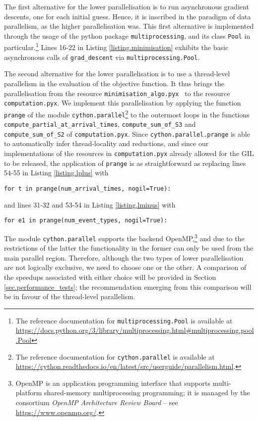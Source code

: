 \documentclass[10pt, article,table]{article}
\begin{document}
The first alternative for the lower parallelisation is to run asynchronous gradient descents, one for each initial guess. Hence, it is inscribed in the paradigm of data parallelism, as the higher parallelisation was. This first alternative is implemented through the usage of the python package \texttt{multiprocessing}, and its class \texttt{Pool} in particular.\footnote{The reference documentation for \texttt{multiprocessing.Pool} is available at \url{https://docs.python.org/3/library/multiprocessing.html\#multiprocessing.pool.Pool}} Lines 16-22 in Listing \ref{listing.minimisation} exhibits the basic asynchronous calls of \texttt{grad\_descent} via \texttt{multiprocessing.Pool}.   

The second alternative for the lower parallelisation is to use a thread-level parallelism in the evaluation of the objective function. It thus brings the parallelisation from the resource \texttt{minimisation\_algo.pyx } to the resource \texttt{computation.pyx}. We implement this parallelisation by applying the function \texttt{prange} of the module \texttt{cython.parallel}\footnote{The reference documentation for \texttt{cython.parallel} is available at \url{https://cython.readthedocs.io/en/latest/src/userguide/parallelism.html}.} to the outermost loops in the functions \texttt{compute\_partial\_at\_arrival\_times}, \texttt{compute\_sum\_of\_S3} and \texttt{compute\_sum\_of\_S2} of \texttt{computation.pyx}. Since \texttt{cython.parallel.prange} is able to automatically infer thread-locality and reductions, and since our implementations of the resources in \texttt{computation.pyx} already allowed for the GIL to be released, the application of \texttt{prange} is as straightforward as replacing lines 54-55 in Listing \ref{listing.lplus} with
\begin{verbatim}
for t in prange(num_arrival_times, nogil=True): 
\end{verbatim}
and lines 31-32 and 53-54 in Listing \ref{listing.lminus} with 
\begin{verbatim}
for e1 in prange(num_event_types, nogil=True):
\end{verbatim}

The module \texttt{cython.parallel} supports the backend OpenMP,\footnote{OpenMP is an application programming interface that supports multi-platform shared-memory multiprocessing programming; it is managed by the consortium \emph{OpenMP Architecture Review Board} -- see \url{https://www.openmp.org/}.} and due to the restrictions of the latter the functionality in the former can only be used from the main parallel region. Therefore, although the two types of lower parallelisation are not logically exclusive, we need to choose one or the other. A comparison of the speedups associated with either choice will be provided in Section \ref{sec.performance_tests}; the recommendation emerging from this comparison will be in favour of the thread-level parallelism. 
\end{document}

